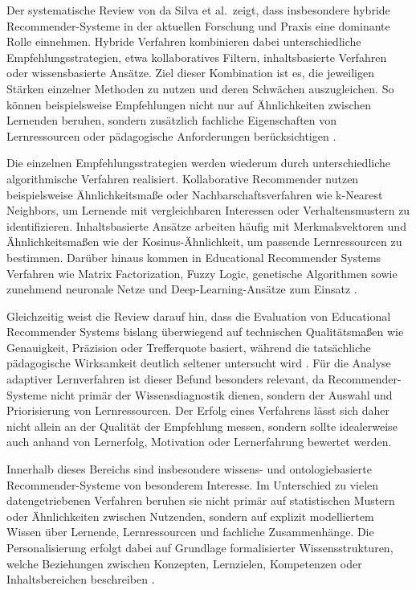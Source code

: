 Der systematische Review von da Silva et al.~zeigt, dass insbesondere
hybride Recommender-Systeme in der aktuellen Forschung und Praxis eine
dominante Rolle einnehmen. Hybride Verfahren kombinieren dabei
unterschiedliche Empfehlungsstrategien, etwa kollaboratives Filtern,
inhaltsbasierte Verfahren oder wissensbasierte Ansätze. Ziel dieser
Kombination ist es, die jeweiligen Stärken einzelner Methoden zu nutzen
und deren Schwächen auszugleichen. So können beispielsweise Empfehlungen
nicht nur auf Ähnlichkeiten zwischen Lernenden beruhen, sondern
zusätzlich fachliche Eigenschaften von Lernressourcen oder pädagogische
Anforderungen berücksichtigen \citep{daSilva2023}.

Die einzelnen Empfehlungsstrategien werden wiederum durch
unterschiedliche algorithmische Verfahren realisiert. Kollaborative
Recommender nutzen beispielsweise Ähnlichkeitsmaße oder
Nachbarschaftsverfahren wie k-Nearest Neighbors, um Lernende mit
vergleichbaren Interessen oder Verhaltensmustern zu identifizieren.
Inhaltsbasierte Ansätze arbeiten häufig mit Merkmalsvektoren und
Ähnlichkeitsmaßen wie der Kosinus-Ähnlichkeit, um passende
Lernressourcen zu bestimmen. Darüber hinaus kommen in Educational
Recommender Systems Verfahren wie Matrix Factorization, Fuzzy Logic,
genetische Algorithmen sowie zunehmend neuronale Netze und
Deep-Learning-Ansätze zum Einsatz \citep{daSilva2023}.

Gleichzeitig weist die Review darauf hin, dass die Evaluation von
Educational Recommender Systems bislang überwiegend auf technischen
Qualitätsmaßen wie Genauigkeit, Präzision oder Trefferquote basiert,
während die tatsächliche pädagogische Wirksamkeit deutlich seltener
untersucht wird \citep{daSilva2023}. Für die Analyse adaptiver
Lernverfahren ist dieser Befund besonders relevant, da
Recommender-Systeme nicht primär der Wissensdiagnostik dienen, sondern
der Auswahl und Priorisierung von Lernressourcen. Der Erfolg eines
Verfahrens lässt sich daher nicht allein an der Qualität der Empfehlung
messen, sondern sollte idealerweise auch anhand von Lernerfolg,
Motivation oder Lernerfahrung bewertet werden.

Innerhalb dieses Bereichs sind insbesondere wissens- und
ontologiebasierte Recommender-Systeme von besonderem Interesse. Im
Unterschied zu vielen datengetriebenen Verfahren beruhen sie nicht
primär auf statistischen Mustern oder Ähnlichkeiten zwischen Nutzenden,
sondern auf explizit modelliertem Wissen über Lernende, Lernressourcen
und fachliche Zusammenhänge. Die Personalisierung erfolgt dabei auf
Grundlage formalisierter Wissensstrukturen, welche Beziehungen zwischen
Konzepten, Lernzielen, Kompetenzen oder Inhaltsbereichen beschreiben
\citep{George2019}.

